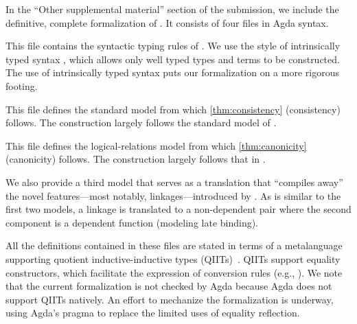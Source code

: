 In the ``Other supplemental material'' section of the submission, we
include the definitive, complete formalization of \TT.
It consists of four files in Agda syntax.
%

\begin{description}[
    itemsep=.5ex,topsep=.6ex,
    labelsep=1.5ex,
    leftmargin=6.5ex,
    font=\ttfamily\bfseries,
]

\item[Syntax.agda]

This file contains the syntactic typing rules of \TT.
We use the style of intrinsically typed syntax \cite{chapman2009type},
which allows only well typed \TT types and terms to be constructed.
The use of intrinsically typed syntax puts our formalization on a more
rigorous footing.

\item[Semantic.agda]

This file defines the standard model from which
\cref{thm:consistency} (consistency) follows.
%
The construction largely follows the standard model of
\cite{altkap2016,kaposi2017type,kaposi2019gluing}.

\item[Canonicity.agda]

This file defines the logical-relations model from which
\cref{thm:canonicity} (canonicity) follows.
%
The construction largely follows that in
\cite{coquand2018canonicity,sterling2019algebraic}.

\item[SynTranslation.agda]

We also provide a third model that serves as a translation that ``compiles
away'' the novel features---most notably, linkages---introduced by \TT.
As is similar to the first two models, 
a linkage is translated to a non-dependent pair where the
second component is a dependent function (modeling late binding).

\end{description}

All the definitions contained in these files are stated in
terms of a meta\-language supporting quotient inductive-inductive types
(QIITs)~\cite{nordvall2010inductive,altkap2016}.
QIITs support equality constructors, which facilitate the expression of
conversion rules (e.g., ).
%
We note that the current formalization is not checked by Agda because
Agda does not support QIITs natively.
An effort to mechanize the formalization is underway, using Agda's
 pragma to replace the limited uses of equality reflection.

